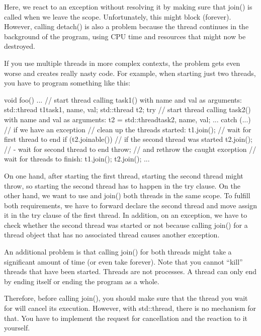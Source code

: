 Here, we react to an exception without resolving it by making sure that join() is called when we leave the scope. Unfortunately, this might block (forever). However, calling detach() is also a problem because the thread continues in the background of the program, using CPU time and resources that might now be destroyed.

If you use multiple threads in more complex contexts, the problem gets even worse and creates really nasty code. For example, when starting just two threads, you have to program something like this:

\begin{cpp}
void foo()
{
	...
	// start thread calling task1() with name and val as arguments:
	std::thread t1{task1, name, val};
	std::thread t2;
	try {
		// start thread calling task2() with name and val as arguments:
		t2 = std::thread{task2, name, val};
		...
	}
	catch (...) { // if we have an exception
		// clean up the threads started:
		t1.join(); // wait for first thread to end
		if (t2.joinable()) { // if the second thread was started
			t2.join(); // - wait for second thread to end
		}
		throw; // and rethrow the caught exception
	}
	// wait for threads to finish:
	t1.join();
	t2.join();
	...
}
\end{cpp}

On one hand, after starting the first thread, starting the second thread might throw, so starting the second thread has to happen in the try clause. On the other hand, we want to use and join() both threads in the same scope. To fulfill both requirements, we have to forward declare the second thread and move assign it in the try clause of the first thread. In addition, on an exception, we have to check whether the second thread was started or not because calling join() for a thread object that has no associated thread causes another exception.

An additional problem is that calling join() for both threads might take a significant amount of time (or even take forever). Note that you cannot “kill” threads that have been started. Threads are not processes. A thread can only end by ending itself or ending the program as a whole.

Therefore, before calling join(), you should make sure that the thread you wait for will cancel its execution. However, with std::thread, there is no mechanism for that. You have to implement the request for cancellation and the reaction to it yourself.


